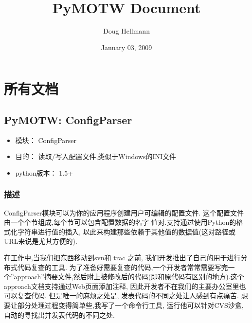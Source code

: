 \documentclass[a4paper,10pt,english]{manual}
\title{PyMOTW Document}
\date{January 03, 2009}
\author{Doug Hellmann}
\begin{document}

\maketitle
\tableofcontents
\resetcurrentobjects


\chapter{所有文档}
\resetcurrentobjects

\section{PyMOTW: ConfigParser}
\begin{itemize}
\item {} 
模块： ConfigParser

\item {} 
目的： 读取/写入配置文件,类似于Windows的INI文件

\item {} 
python版本： 1.5+

\end{itemize}


\subsection{描述}

ConfigParser模块可以为你的应用程序创建用户可编辑的配置文件. 这个配置文件由一个个节组成,每个节可以包含配置数据的名字-值对.支持通过使用Python的格式化字符串进行值的插入, 以此来构建那些依赖于其他值的数据值(这对路径或URL来说是尤其方便的).

在工作中,当我们把东西移动到svn和 \href{http://trac.edgewall.org/}{trac} 之前, 我们开发推出了自己的用于进行分布式代码复查的工具. 为了准备好需要复查的代码,一个开发者常常需要写完一个''approach''摘要文件,然后附上被修改后的代码(即和原代码有区别的地方).这个 approach文档支持通过Web页面添加注释, 因此开发者不在我们的主要办公室里也可以复查代码. 但是唯一的麻烦之处是, 发表代码的不同之处让人感到有点痛苦. 想要让部分处理过程变得简单些,我写了一个命令行工具, 运行他可以针对CVS沙盒,自动的寻找出并发表代码的不同之处.
\end{document}
